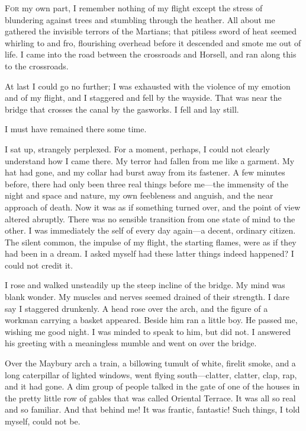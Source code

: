 


\lettrine[lines=4,findent=2pt]{F}{or} my own part, I remember nothing of my flight except the stress of blundering against trees and stumbling through the heather. All about me gathered the invisible terrors of the Martians; that pitiless sword of heat seemed whirling to and fro, flourishing overhead before it descended and smote me out of life. I came into the road between the crossroads and Horsell, and ran along this to the crossroads.

At last I could go no further; I was exhausted with the violence of my emotion and of my flight, and I staggered and fell by the wayside. That was near the bridge that crosses the canal by the gasworks. I fell and lay still.

I must have remained there some time.

I sat up, strangely perplexed. For a moment, perhaps, I could not clearly understand how I came there. My terror had fallen from me like a garment. My hat had gone, and my collar had burst away from its fastener. A few minutes before, there had only been three real things before me—the immensity of the night and space and nature, my own feebleness and anguish, and the near approach of death. Now it was as if something turned over, and the point of view altered abruptly. There was no sensible transition from one state of mind to the other. I was immediately the self of every day again—a decent, ordinary citizen. The silent common, the impulse of my flight, the starting flames, were as if they had been in a dream. I asked myself had these latter things indeed happened? I could not credit it.

I rose and walked unsteadily up the steep incline of the bridge. My mind was blank wonder. My muscles and nerves seemed drained of their strength. I dare say I staggered drunkenly. A head rose over the arch, and the figure of a workman carrying a basket appeared. Beside him ran a little boy. He passed me, wishing me good night. I was minded to speak to him, but did not. I answered his greeting with a meaningless mumble and went on over the bridge.

Over the Maybury arch a train, a billowing tumult of white, firelit smoke, and a long caterpillar of lighted windows, went flying south—clatter, clatter, clap, rap, and it had gone. A dim group of people talked in the gate of one of the houses in the pretty little row of gables that was called Oriental Terrace. It was all so real and so familiar. And that behind me! It was frantic, fantastic! Such things, I told myself, could not be.

